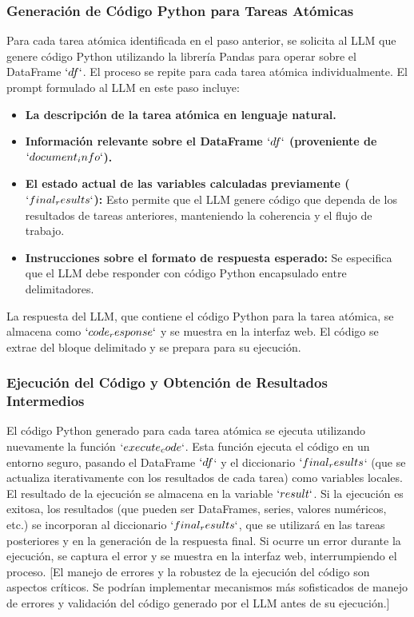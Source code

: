 \subsubsection{Generación de Código Python para Tareas Atómicas}

Para cada tarea atómica identificada en el paso anterior, se solicita al LLM que genere código Python utilizando la librería Pandas para operar sobre el DataFrame $`df`$.  El proceso se repite para cada tarea atómica individualmente.  El prompt formulado al LLM en este paso incluye:

\begin{itemize}
	\item \textbf{La descripción de la tarea atómica en lenguaje natural.}
	\item \textbf{Información relevante sobre el DataFrame $`df`$ (proveniente de $`document_info`$).}
	\item \textbf{El estado actual de las variables calculadas previamente ($`final_results`$):}  Esto permite que el LLM genere código que dependa de los resultados de tareas anteriores,  manteniendo la coherencia y el flujo de trabajo.
	\item \textbf{Instrucciones sobre el formato de respuesta esperado:} Se especifica que el LLM debe responder con código Python encapsulado entre delimitadores.
\end{itemize}
La respuesta del LLM, que contiene el código Python para la tarea atómica, se almacena como $`code_response`$ y se muestra en la interfaz web.  El código se extrae del bloque delimitado y se prepara para su ejecución.

\subsubsection{Ejecución del Código y Obtención de Resultados Intermedios}

El código Python generado para cada tarea atómica se ejecuta utilizando nuevamente la función $`execute_code`$.  Esta función ejecuta el código en un entorno seguro,  pasando el DataFrame $`df$` y el diccionario $`final_results$` (que se actualiza iterativamente con los resultados de cada tarea) como variables locales.  El resultado de la ejecución se almacena en la variable $`result`$.  Si la ejecución es exitosa,  los resultados (que pueden ser DataFrames, series, valores numéricos, etc.) se incorporan al diccionario $`final_results`$,  que se utilizará en las tareas posteriores y en la generación de la respuesta final.  Si ocurre un error durante la ejecución,  se captura el error y se muestra en la interfaz web,  interrumpiendo el proceso. [El manejo de errores y la robustez de la ejecución del código son aspectos críticos.  Se podrían implementar mecanismos más sofisticados de manejo de errores y validación del código generado por el LLM antes de su ejecución.]

